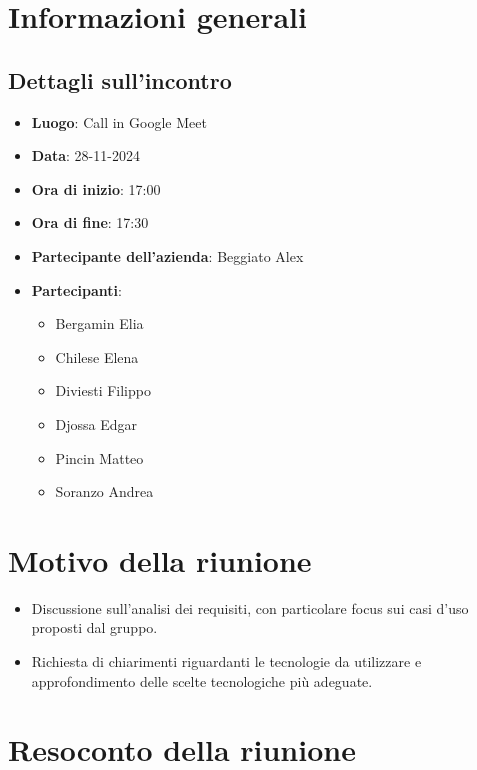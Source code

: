 \section{Informazioni generali}
\subsection{Dettagli sull'incontro}
\begin{itemize}
    \item \textbf{Luogo}: Call in Google Meet
    \item \textbf{Data}: 28-11-2024
    \item \textbf{Ora di inizio}: 17:00
    \item \textbf{Ora di fine}: 17:30
    \item \textbf{Partecipante dell'azienda}: Beggiato Alex
    \item \textbf{Partecipanti}:
    \begin{itemize}
        \item Bergamin Elia
        \item Chilese Elena
        \item Diviesti Filippo
        \item Djossa Edgar
        \item Pincin Matteo 
        \item Soranzo Andrea  
    \end{itemize}
\end{itemize}

\section{Motivo della riunione}
\begin{itemize}
    \item Discussione sull'analisi dei requisiti, con particolare focus sui casi d'uso proposti dal gruppo.
    \item Richiesta di chiarimenti riguardanti le tecnologie da utilizzare e approfondimento delle scelte tecnologiche più adeguate.
\end{itemize}

\section{Resoconto della riunione}

